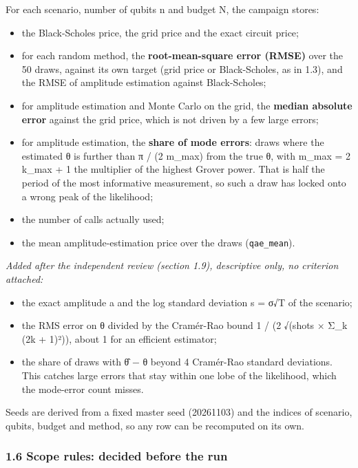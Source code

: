 \documentclass[
  10pt,
]{article}
\providecommand{\tightlist}{%
  \setlength{\itemsep}{0pt}\setlength{\parskip}{0pt}}
\begin{document}
For each scenario, number of qubits n and budget N, the campaign stores:

\begin{itemize}
\tightlist
\item
  the Black-Scholes price, the grid price and the exact circuit price;
\item
  for each random method, the \textbf{root-mean-square error (RMSE)}
  over the 50 draws, against its own target (grid price or
  Black-Scholes, as in 1.3), and the RMSE of amplitude estimation
  against Black-Scholes;
\item
  for amplitude estimation and Monte Carlo on the grid, the
  \textbf{median absolute error} against the grid price, which is not
  driven by a few large errors;
\item
  for amplitude estimation, the \textbf{share of mode errors}: draws
  where the estimated θ is further than π / (2 m\_max) from the true θ,
  with m\_max = 2 k\_max + 1 the multiplier of the highest Grover power.
  That is half the period of the most informative measurement, so such a
  draw has locked onto a wrong peak of the likelihood;
\item
  the number of calls actually used;
\item
  the mean amplitude-estimation price over the draws
  (\texttt{qae\_mean}).
\end{itemize}

\emph{Added after the independent review (section 1.9), descriptive
only, no criterion attached:}

\begin{itemize}
\tightlist
\item
  the exact amplitude a and the log standard deviation s = σ√T of the
  scenario;
\item
  the RMS error on θ divided by the Cramér-Rao bound 1 / (2 √(shots ×
  Σ\_k (2k + 1)²)), about 1 for an efficient estimator;
\item
  the share of draws with \textbar θ̂ − θ\textbar{} beyond 4 Cramér-Rao
  standard deviations. This catches large errors that stay within one
  lobe of the likelihood, which the mode-error count misses.
\end{itemize}

Seeds are derived from a fixed master seed (20261103) and the indices of
scenario, qubits, budget and method, so any row can be recomputed on its
own.

\hypertarget{16-scope-rules-decided-before-the-run}{%
\subsubsection{1.6 Scope rules: decided before the
run}\label{16-scope-rules-decided-before-the-run}}
\end{document}
